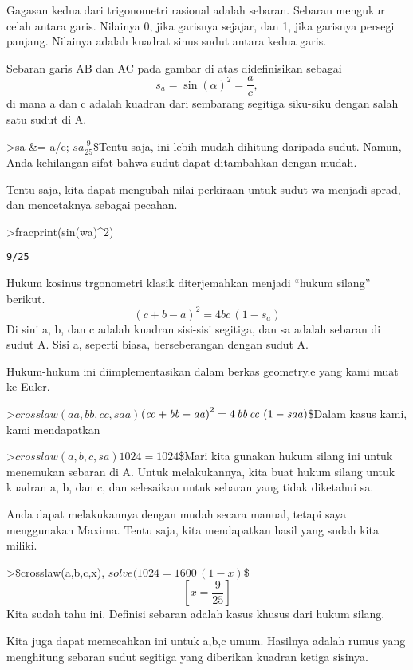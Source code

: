 \documentclass[
]{book}
\begin{document}
Gagasan kedua dari trigonometri rasional adalah sebaran. Sebaran mengukur celah antara garis. Nilainya 0, jika garisnya sejajar, dan 1, jika garisnya persegi panjang. Nilainya adalah kuadrat sinus sudut antara kedua garis.

Sebaran garis AB dan AC pada gambar di atas didefinisikan sebagai \[s_a = \sin(\alpha)^2 = \frac{a}{c},\]di mana a dan c adalah kuadran dari sembarang segitiga siku-siku dengan salah satu sudut di A.

\textgreater sa \&= a/c; \(sa\)\(\frac{9}{25}\)\$Tentu saja, ini lebih mudah dihitung daripada sudut. Namun, Anda kehilangan sifat bahwa sudut dapat ditambahkan dengan mudah.

Tentu saja, kita dapat mengubah nilai perkiraan untuk sudut wa menjadi sprad, dan mencetaknya sebagai pecahan.

\textgreater fracprint(sin(wa)\^{}2)

\begin{verbatim}
9/25
\end{verbatim}

Hukum kosinus trgonometri klasik diterjemahkan menjadi ``hukum silang'' berikut. \[(c+b-a)^2 = 4 b c \, (1-s_a)\]Di sini a, b, dan c adalah kuadran sisi-sisi segitiga, dan sa adalah sebaran di sudut A. Sisi a, seperti biasa, berseberangan dengan sudut A.

Hukum-hukum ini diimplementasikan dalam berkas geometry.e yang kami muat ke Euler.

\textgreater{}\(crosslaw(aa,bb,cc,saa)\)\(\left({\it cc}+{\it bb}-{\it aa}\right)^2=4\,{\it bb}\,{\it cc}\,\left(1-{\it saa}\right)\)\$Dalam kasus kami, kami mendapatkan

\textgreater{}\(crosslaw(a,b,c,sa)\)\(1024=1024\)\$Mari kita gunakan hukum silang ini untuk menemukan sebaran di A. Untuk melakukannya, kita buat hukum silang untuk kuadran a, b, dan c, dan selesaikan untuk sebaran yang tidak diketahui sa.

Anda dapat melakukannya dengan mudah secara manual, tetapi saya menggunakan Maxima. Tentu saja, kita mendapatkan hasil yang sudah kita miliki.

\textgreater\$crosslaw(a,b,c,x), \(solve(%
\)\(1024=1600\,\left(1-x\right)\)\$ \[\left[ x=\frac{9}{25} \right]\]Kita sudah tahu ini. Definisi sebaran adalah kasus khusus dari hukum silang.

Kita juga dapat memecahkan ini untuk a,b,c umum. Hasilnya adalah rumus yang menghitung sebaran sudut segitiga yang diberikan kuadran ketiga sisinya.
\end{document}
